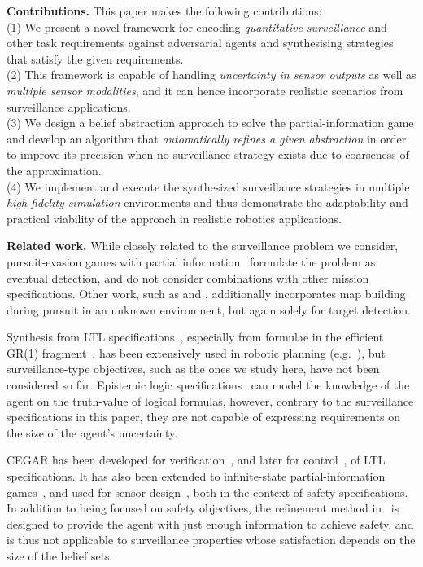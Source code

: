 {\bf Contributions.}  This paper makes the following contributions:\\
(1) We present a novel framework for encoding \emph{quantitative surveillance} and other task requirements against adversarial agents and synthesising strategies that satisfy the given requirements.\\
(2) This framework is capable of handling \emph{uncertainty in sensor outputs} as well as \emph{multiple sensor modalities}, and it can hence incorporate realistic scenarios from surveillance applications.  \\
(3) We design a belief abstraction approach to solve the partial-information game and develop an algorithm that \emph{automatically refines a given abstraction} in order to improve its precision when no surveillance strategy exists due to coarseness of the approximation.\\
(4) We implement and execute the synthesized surveillance strategies in multiple \emph{high-fidelity simulation} environments and thus demonstrate the adaptability and practical viability of the approach in realistic robotics applications.



{\bf Related work.}
While closely related to the surveillance problem we consider, pursuit-evasion games with partial information~\cite{Chung2011, Chin2010, Antoniades2003} formulate the problem as eventual detection, and do not consider combinations with other mission specifications. Other work, such as \cite{Vidal2002} and \cite{Kim2001}, additionally incorporates map building during pursuit in an unknown environment, but again solely for target detection.

Synthesis from LTL specifications~\cite{Pnueli1989}, especially from formulae in the efficient GR(1) fragment~\cite{Piterman2006}, has been extensively used in robotic planning (e.g.~\cite{wong2012,Kress2007}), but surveillance-type objectives, such as the ones we study here, have not been considered so far. Epistemic logic specifications~\cite{MeydenV98} can model the knowledge of the agent on the truth-value of logical formulas, however, contrary to the surveillance specifications in this paper, they are not capable of expressing requirements on the size of the agent's uncertainty.

CEGAR has been developed for verification~\cite{ClarkeGJLV00}, and later for control~\cite{HenzingerJM03}, of LTL specifications. 
It has also been extended to infinite-state partial-information games~\cite{DimitrovaF08}, and used for sensor design~\cite{FuDT14}, both in the context of safety specifications. In addition to being focused on safety objectives, the refinement method in~\cite{DimitrovaF08} is designed to provide the agent with just enough information to achieve safety, and is thus not applicable to surveillance properties whose satisfaction depends on the size of the belief sets.

